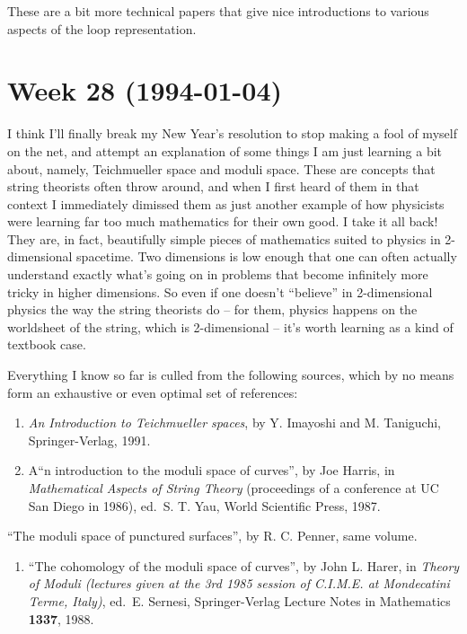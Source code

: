\documentclass{article}
\def\tightlist{}
\begin{document}
These are a bit more technical papers that give nice introductions to
various aspects of the loop representation.
\hypertarget{week28}{%
\section{Week 28 (1994-01-04)}\label{week28}}

I think I'll finally break my New Year's resolution to stop making a
fool of myself on the net, and attempt an explanation of some things I
am just learning a bit about, namely, Teichmueller space and moduli
space. These are concepts that string theorists often throw around, and
when I first heard of them in that context I immediately dimissed them
as just another example of how physicists were learning far too much
mathematics for their own good. I take it all back! They are, in fact,
beautifully simple pieces of mathematics suited to physics in
2-dimensional spacetime. Two dimensions is low enough that one can often
actually understand exactly what's going on in problems that become
infinitely more tricky in higher dimensions. So even if one doesn't
``believe'' in 2-dimensional physics the way the string theorists do --
for them, physics happens on the worldsheet of the string, which is
2-dimensional -- it's worth learning as a kind of textbook case.

Everything I know so far is culled from the following sources, which by
no means form an exhaustive or even optimal set of references:

\begin{enumerate}
\def\labelenumi{\arabic{enumi})}
\item
  \emph{An Introduction to Teichmueller spaces}, by Y. Imayoshi and M.
  Taniguchi, Springer-Verlag, 1991.
\item
  A``n introduction to the moduli space of curves'', by Joe Harris, in
  \emph{Mathematical Aspects of String Theory} (proceedings of a
  conference at UC San Diego in 1986), ed.~S. T. Yau, World Scientific
  Press, 1987.
\end{enumerate}

``The moduli space of punctured surfaces'', by R. C. Penner, same
volume.

\begin{enumerate}
\def\labelenumi{\arabic{enumi})}
\setcounter{enumi}{2}
\tightlist
\item
  ``The cohomology of the moduli space of curves'', by John L. Harer, in
  \emph{Theory of Moduli (lectures given at the 3rd 1985 session of
  C.I.M.E. at Mondecatini Terme, Italy)}, ed.~E. Sernesi,
  Springer-Verlag Lecture Notes in Mathematics \textbf{1337}, 1988.
\end{enumerate}
\end{document}
